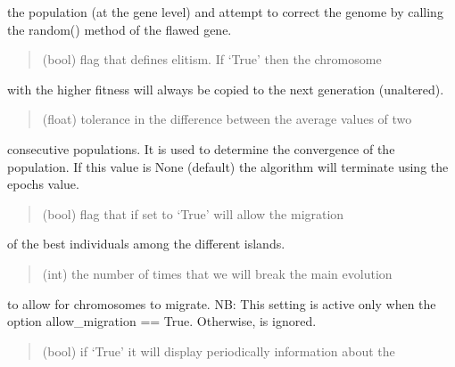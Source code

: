 \documentclass[letterpaper,10pt,english]{sphinxmanual}
\begin{document}
\begin{fulllineitems}
\begin{fulllineitems}
\begin{quote}
\begin{description}
\end{description}\end{quote}

\sphinxAtStartPar
the population (at the gene level) and attempt to correct the genome by calling
the random() method of the flawed gene.
\begin{quote}\begin{description}
\sphinxAtStartPar
{} \textendash{} (bool) flag that defines elitism. If ‘True’ then the chromosome

\end{description}\end{quote}

\sphinxAtStartPar
with the higher fitness will always be copied to the next generation (unaltered).
\begin{quote}\begin{description}
\sphinxAtStartPar
{} \textendash{} (float) tolerance in the difference between the average values of two

\end{description}\end{quote}

\sphinxAtStartPar
consecutive populations. It is used to determine the convergence of the population.
If this value is None (default) the algorithm will terminate using the epochs value.
\begin{quote}\begin{description}
\sphinxAtStartPar
{} \textendash{} (bool) flag that if set to ‘True’ will allow the migration

\end{description}\end{quote}

\sphinxAtStartPar
of the best individuals among the different islands.
\begin{quote}\begin{description}
\sphinxAtStartPar
{} \textendash{} (int) the number of times that we will break the main evolution

\end{description}\end{quote}

\sphinxAtStartPar
to allow for chromosomes to migrate. NB: This setting is active only when the option
allow\_migration == True. Otherwise, is ignored.
\begin{quote}\begin{description}
\sphinxAtStartPar
{} \textendash{} (bool) if ‘True’ it will display periodically information about the


\end{description}
\end{quote}
\end{fulllineitems}
\end{fulllineitems}
\end{document}
